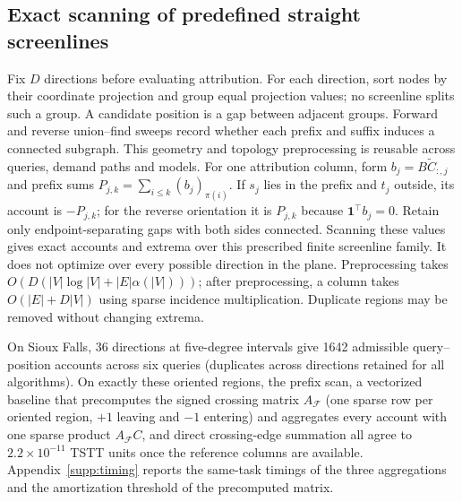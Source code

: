 \subsection{Exact scanning of predefined straight screenlines}\label{sec:scan}
Fix $D$ directions before evaluating attribution. For each direction, sort nodes by their coordinate projection and group equal projection values; no screenline splits such a group. A candidate position is a gap between adjacent groups. Forward and reverse union--find sweeps record whether each prefix and suffix induces a connected subgraph. This geometry and topology preprocessing is reusable across queries, demand paths and models.
For one attribution column, form $b_j=B\widetilde C_{:,j}$ and prefix sums $P_{j,k}=\sum_{i\leq k}(b_j)_{\pi(i)}$. If $s_j$ lies in the prefix and $t_j$ outside, its account is $-P_{j,k}$; for the reverse orientation it is $P_{j,k}$ because $\mathbf1^\top b_j=0$. Retain only endpoint-separating gaps with both sides connected. Scanning these values gives exact accounts and extrema over this prescribed finite screenline family. It does not optimize over every possible direction in the plane. Preprocessing takes $O(D(|V|\log|V|+|E|\alpha(|V|)))$; after preprocessing, a column takes $O(|E|+D|V|)$ using sparse incidence multiplication. Duplicate regions may be removed without changing extrema.

On Sioux Falls, 36 directions at five-degree intervals give 1642 admissible query--position accounts across six queries (duplicates across directions retained for all algorithms). On exactly these oriented regions, the prefix scan, a vectorized baseline that precomputes the signed crossing matrix $A_{\mathcal F}$ (one sparse row per oriented region, $+1$ leaving and $-1$ entering) and aggregates every account with one sparse product $A_{\mathcal F}C$, and direct crossing-edge summation all agree to $2.2\times10^{-11}$ TSTT units once the reference columns are available. Appendix~\ref{supp:timing} reports the same-task timings of the three aggregations and the amortization threshold of the precomputed matrix.
